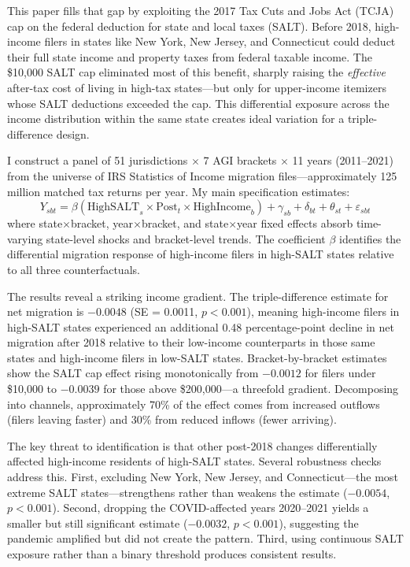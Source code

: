 \documentclass[12pt]{article}
\begin{document}
This paper fills that gap by exploiting the 2017 Tax Cuts and Jobs Act (TCJA) cap on the federal deduction for state and local taxes (SALT). Before 2018, high-income filers in states like New York, New Jersey, and Connecticut could deduct their full state income and property taxes from federal taxable income. The \$10,000 SALT cap eliminated most of this benefit, sharply raising the \textit{effective} after-tax cost of living in high-tax states---but only for upper-income itemizers whose SALT deductions exceeded the cap. This differential exposure across the income distribution within the same state creates ideal variation for a triple-difference design.

I construct a panel of 51 jurisdictions $\times$ 7 AGI brackets $\times$ 11 years (2011--2021) from the universe of IRS Statistics of Income migration files---approximately 125 million matched tax returns per year. My main specification estimates:
\begin{equation}
Y_{sbt} = \beta(\text{HighSALT}_s \times \text{Post}_t \times \text{HighIncome}_b) + \gamma_{sb} + \delta_{bt} + \theta_{st} + \varepsilon_{sbt}
\end{equation}
where state$\times$bracket, year$\times$bracket, and state$\times$year fixed effects absorb time-varying state-level shocks and bracket-level trends. The coefficient $\beta$ identifies the differential migration response of high-income filers in high-SALT states relative to all three counterfactuals.

The results reveal a striking income gradient. The triple-difference estimate for net migration is $-0.0048$ (SE = 0.0011, $p < 0.001$), meaning high-income filers in high-SALT states experienced an additional 0.48 percentage-point decline in net migration after 2018 relative to their low-income counterparts in those same states and high-income filers in low-SALT states. Bracket-by-bracket estimates show the SALT cap effect rising monotonically from $-0.0012$ for filers under \$10,000 to $-0.0039$ for those above \$200,000---a threefold gradient. Decomposing into channels, approximately 70\% of the effect comes from increased outflows (filers leaving faster) and 30\% from reduced inflows (fewer arriving).

The key threat to identification is that other post-2018 changes differentially affected high-income residents of high-SALT states. Several robustness checks address this. First, excluding New York, New Jersey, and Connecticut---the most extreme SALT states---strengthens rather than weakens the estimate ($-0.0054$, $p < 0.001$). Second, dropping the COVID-affected years 2020--2021 yields a smaller but still significant estimate ($-0.0032$, $p < 0.001$), suggesting the pandemic amplified but did not create the pattern. Third, using continuous SALT exposure rather than a binary threshold produces consistent results.
\end{document}

